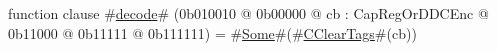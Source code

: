 function clause #\hyperref[sailMIPSzdecode]{decode}# (0b010010 @ 0b00000 @ cb : CapRegOrDDCEnc @    0b11000 @    0b11111 @ 0b111111) = #\hyperref[sailMIPSzSome]{Some}#(#\hyperref[sailMIPSzCClearTags]{CClearTags}#(cb))
